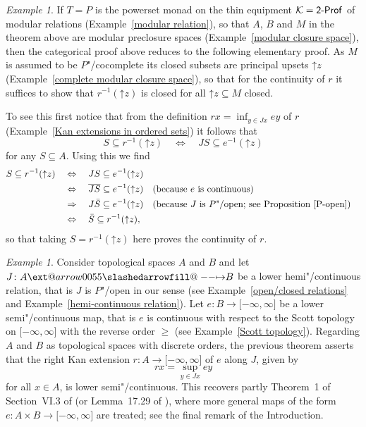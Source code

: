 \documentclass[preprint, a4paper]{elsarticle}
\makeatletter
\def\slashedarrowfill@#1#2#3#4#5{%
  $\m@th\thickmuskip0mu\medmuskip\thickmuskip\thinmuskip\thickmuskip
   \relax#5#1\mkern-7mu%
   \cleaders\hbox{$#5\mkern-2mu#2\mkern-2mu$}\hfill
   \mathclap{#3}\mathclap{#2}%
   \cleaders\hbox{$#5\mkern-2mu#2\mkern-2mu$}\hfill
   \mkern-7mu#4$%
}
\def\rightslashedarrowfill@{%
  \slashedarrowfill@\relbar\relbar\mapstochar\rightarrow}
\newcommand\xslashedrightarrow[2][]{%
  \ext@arrow 0055{\rightslashedarrowfill@}{#1}{#2}}
\def\slashedrightarrow{\xslashedrightarrow{}}
\theoremstyle{definition}
\theoremstyle{remark}
\newtheorem{example}[theorem]{Example}
\providecommand{\exref}[1]{Example~\ref{#1}}
\providecommand{\propref}[1]{Proposition~\ref{#1}}
\renewcommand{\implies}{\Rightarrow}
\renewcommand{\iff}{\Leftrightarrow}
\providecommand{\brks}[1]{\lbrack #1 \rbrack}
\providecommand{\upset}{\mathord\uparrow}
\providecommand{\map}[3]{#1\colon#2\to#3}
\providecommand{\hmap}[3]{#1\colon#2\slashedrightarrow#3}
\providecommand{\inv}[1]{{#1}^{-1}}
\providecommand{\catvar}[1]{\mathcal{#1}}
\providecommand{\2}{\mathsf 2}
\providecommand{\K}{\catvar K}
\providecommand{\Prof}{\mathsf{Prof}}
\providecommand{\enProf}[1]{#1\text-\Prof}
\makeatother
\begin{document}
	\begin{example}
		If $T = P$ is the powerset monad on the thin equipment $\K = \enProf\2$ of modular relations (\exref{modular relation}), so that $A$, $B$ and $M$ in the theorem above are modular preclosure spaces (\exref{modular closure space}), then the categorical proof above reduces to the following elementary proof. As $M$ is assumed to be $P$"/cocomplete its closed subsets are principal upsets $\upset z$ (\exref{complete modular closure space}), so that for the continuity of $r$ it suffices to show that $\inv r(\upset z)$ is closed for all $\upset z \subseteq M$ closed.
		
		To see this first notice that from the definition $rx = \inf_{y \in Jx} ey$ of $r$ (\exref{Kan extensions in ordered sets}) it follows that
		\begin{displaymath}
			S \subseteq \inv r(\upset z) \quad \iff \quad JS \subseteq \inv e(\upset z)
		\end{displaymath}
		for any $S \subseteq A$. Using this we find
		\begin{align*}
			S \subseteq \inv r(\upset z) \quad &\iff \quad JS \subseteq \inv e(\upset z) \\
			&\iff \quad \overline{JS} \subseteq \inv e(\upset z) && \text{(because $e$ is continuous)} \\
			&\implies \quad J\bar S \subseteq \inv e(\upset z) && \text{(because $J$ is $P$"/open; see \propref{P-open})} \\
			&\iff \quad \bar S \subseteq \inv r(\upset z),
		\end{align*}
		so that taking $S = \inv r(\upset z)$ here proves the continuity of $r$.
	\end{example}
	
	\begin{example} \label{right Kan extension into extended real line}
		Consider topological spaces $A$ and $B$ and let $\hmap JAB$ be a lower hemi"/continuous relation, that is $J$ is $P$"/open in our sense (see \exref{open/closed relations} and \exref{hemi-continuous relation}). Let $\map eB{\brks{-\infty, \infty}}$ be a lower semi"/continuous map, that is $e$ is continuous with respect to the Scott topology on $\brks{-\infty, \infty}$ with the reverse order $\geq$ (see \exref{Scott topology}). Regarding $A$ and $B$ as topological spaces with discrete orders, the previous theorem asserts that the right Kan extension $\map rA{\brks{-\infty, \infty}}$ of $e$ along $J$, given by
		\begin{displaymath}
			rx = \sup_{y \in Jx} ey
		\end{displaymath}
		for all $x \in A$, is lower semi"/continuous. This recovers partly Theorem~1 of Section~VI.3 of \cite{Berge59} (or Lemma~17.29 of \cite{Aliprantis-Border06}), where more general maps of the form \mbox{$\map e{A \times B}{\brks{-\infty, \infty}}$} are treated; see the final remark of the Introduction.
	\end{example}
	
\end{document}
